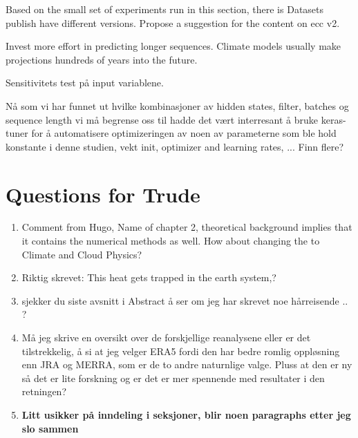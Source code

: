Based on the small set of experiments run in this section, there is 
Datasets publish have different versions. Propose a suggestion for the content on \acrshort{ecc} v2.

Invest more effort in predicting longer sequences. Climate models usually make projections hundreds of years into the future.

Sensitivitets test på input variablene.


Nå som vi har funnet ut hvilke kombinasjoner av hidden states, filter, batches og sequence length vi må begrense oss til hadde det vært interresant å bruke keras-tuner for å automatisere optimizeringen av noen av parameterne som ble hold konstante i denne studien, vekt init, optimizer and learning rates, ... Finn flere?


\section{Questions for Trude}

\begin{enumerate}
    \item Comment from Hugo, Name of chapter 2, theoretical background implies that it contains the numerical methods as well. How about changing the to Climate and Cloud Physics?
    \item Riktig skrevet: This heat gets trapped in the earth system,?
    \item sjekker du siste avsnitt i Abstract å ser om jeg har skrevet noe hårreisende .. ?
    \item Må jeg skrive en oversikt over de forskjellige reanalysene eller er det tilstrekkelig, å si at jeg velger ERA5 fordi den har bedre romlig oppløsning enn JRA og MERRA, som er de to andre naturnlige valge. Pluss at den er ny så det er lite forskning og er det er mer spennende med resultater i den retningen?
    \item \textbf{Litt usikker på inndeling i seksjoner, blir noen paragraphs etter jeg slo sammen }
\end{enumerate}